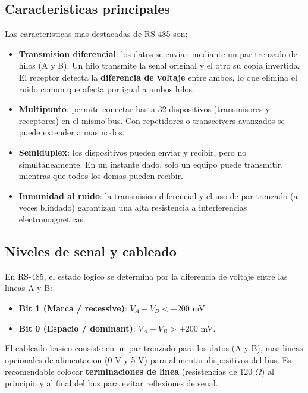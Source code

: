 \subsection{Caracteristicas principales}

Las caracteristicas mas destacadas de RS-485 son:

\begin{itemize}
    \item \textbf{Transmision diferencial}: los datos se envian mediante un par
    trenzado de hilos (A y B). Un hilo transmite la senal original y el otro su
    copia invertida. El receptor detecta la \textbf{diferencia de voltaje} entre
    ambos, lo que elimina el ruido comun que afecta por igual a ambos hilos.
    \item \textbf{Multipunto}: permite conectar hasta 32 dispositivos (transmisores
    y receptores) en el mismo bus. Con repetidores o transceivers avanzados se
    puede extender a mas nodos.
    \item \textbf{Semiduplex}: los dispositivos pueden enviar y recibir, pero no
    simultaneamente. En un instante dado, solo un equipo puede transmitir,
    mientras que todos los demas pueden recibir.
    \item \textbf{Inmunidad al ruido}: la transmision diferencial y el uso de par
    trenzado (a veces blindado) garantizan una alta resistencia a
    interferencias electromagneticas.
\end{itemize}

\subsection{Niveles de senal y cableado}

En RS-485, el estado logico se determina por la diferencia de voltaje entre las
lineas A y B:

\begin{itemize}
    \item \textbf{Bit 1 (Marca / recessive)}: $V_A - V_B < -200$ mV.
    \item \textbf{Bit 0 (Espacio / dominant)}: $V_A - V_B > +200$ mV.
\end{itemize}

El cableado basico consiste en un par trenzado para los datos (A y B), mas
lineas opcionales de alimentacion (0 V y 5 V) para alimentar dispositivos del
bus. Es recomendable colocar \textbf{terminaciones de linea} (resistencias de 120
$\Omega$) al principio y al final del bus para evitar reflexiones de senal.

